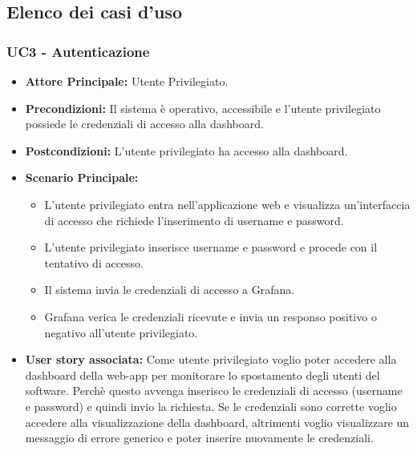 \documentclass[11pt]{article}
\begin{document}
\begin{justify}
\subsection{Elenco dei casi d'uso}

\subsubsection{\textbf{UC3 - Autenticazione}}
\begin{itemize}
     \item \textbf{Attore Principale:} Utente Privilegiato.
     \item \textbf{Precondizioni:} Il sistema è operativo, accessibile e l'utente privilegiato possiede le credenziali 
     di accesso alla dashboard.
     \item \textbf{Postcondizioni:} L'utente privilegiato ha accesso alla dashboard.
     \item \textbf{Scenario Principale:}
     \begin{itemize}
         \item L'utente privilegiato entra nell'applicazione web e visualizza un'interfaccia di accesso che richiede 
         l'inserimento di username e password.
         \item L'utente privilegiato inserisce username e password e procede con il tentativo di accesso.
         \item Il sistema invia le credenziali di accesso a Grafana.
         \item Grafana verica le credenziali ricevute e invia un responso positivo o negativo all'utente privilegiato.
     \end{itemize}
     \item \textbf{User story associata:}
     Come utente privilegiato voglio poter accedere alla dashboard della web-app per monitorare lo spostamento degli 
     utenti del software. Perchè questo avvenga inserisco le credenziali di accesso (username e password) e quindi 
     invio la richiesta. Se le credenziali sono corrette voglio accedere alla visualizzazione della dashboard, 
     altrimenti voglio visualizzare un messaggio di errore generico e poter inserire nuovamente le credenziali.
\end{itemize}


\end{justify}
\end{document}
